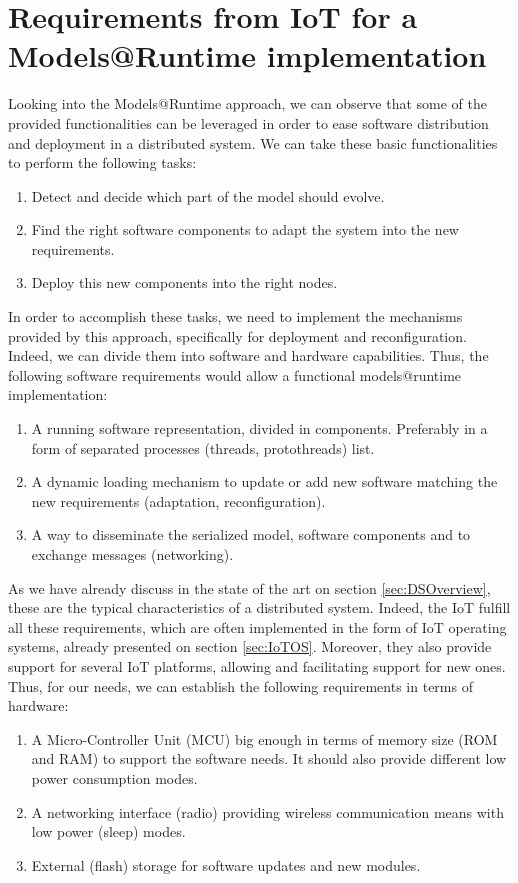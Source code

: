 \section{Requirements from IoT  for a Models@Runtime implementation}
\label{sec:MARMech4IoT}
Looking into the Models@Runtime approach, we can observe that some of the provided functionalities can be leveraged in order to ease software distribution and deployment in a distributed system.
We can take these basic functionalities to perform the following tasks:

\begin{enumerate}
	\item Detect and decide which part of the model should evolve.
	\item Find the right software components to adapt the system into the new requirements.
	\item Deploy this new components into the right nodes.
\end{enumerate}

In order to accomplish these tasks, we need to implement the mechanisms provided by this approach, specifically for deployment and reconfiguration.
Indeed, we can divide them into software and hardware capabilities.
Thus, the following software requirements would allow a functional models@runtime implementation:

\begin{enumerate}
	\item A running software representation, divided in components. Preferably in a form of separated processes (threads, protothreads) list.
	\item A dynamic loading mechanism to update or add new software matching the new requirements (adaptation, reconfiguration).
	\item A way to disseminate the serialized model, software components and to exchange messages (networking).
\end{enumerate}

As we have already discuss in the state of the art on section \ref{sec:DSOverview}, these are the typical characteristics of a distributed system. 
Indeed, the IoT fulfill all these requirements, which are often implemented in the form of IoT operating systems, already presented on section \ref{sec:IoTOS}.
Moreover, they also provide support for several IoT platforms, allowing and facilitating support for new ones.
Thus, for our needs, we can establish the following requirements in terms of hardware:

\begin{enumerate}
	\item A Micro-Controller Unit (MCU) big enough in terms of memory size (ROM and RAM) to support the software needs. It should also provide different low power consumption modes.
	\item A networking interface (radio) providing wireless communication means with low power (sleep) modes.
	\item External (flash) storage for software updates and new modules.
\end{enumerate} 

